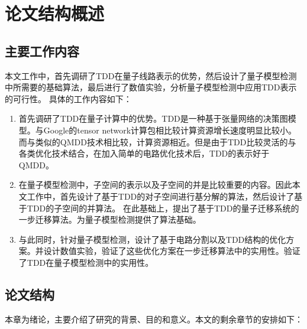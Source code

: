 \section{论文结构概述}

\subsection*{主要工作内容}
本文工作中，首先调研了TDD在量子线路表示的优势，然后设计了量子模型检测中所需要的基础算法，最后进行了数值实验，分析量子模型检测中应用TDD表示的可行性。
具体的工作内容如下：
\begin{enumerate}
    \item 首先调研了TDD在量子计算中的优势。TDD是一种基于张量网络的决策图模型。与Google的tensor network计算包相比较计算资源增长速度明显比较小。而与类似的QMDD技术相比较，计算资源相近。但是由于TDD比较灵活的与各类优化技术结合，在加入简单的电路优化技术后，TDD的表示好于QMDD。
    \item 在量子模型检测中，子空间的表示以及子空间的并是比较重要的内容。因此本文工作中，首先设计了基于TDD的对子空间进行基分解的算法，然后设计了基于TDD的子空间的并算法。
    在此基础上，提出了基于TDD的量子迁移系统的一步迁移算法。为量子模型检测提供了算法基础。
    \item 与此同时，针对量子模型检测，设计了基于电路分割以及TDD结构的优化方案。并设计数值实验，验证了这些优化方案在一步迁移算法中的实用性。验证了TDD在量子模型检测中的实用性。
\end{enumerate}

\subsection*{论文结构}
本章为绪论，主要介绍了研究的背景、目的和意义。本文的剩余章节的安排如下：

